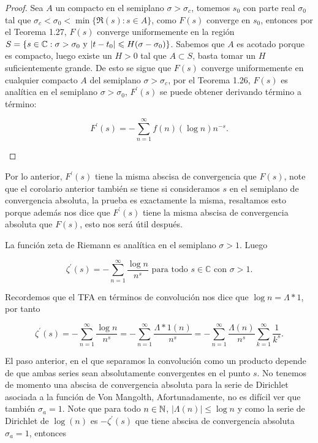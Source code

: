 \begin{proof}
Sea $A$ un compacto en el semiplano $\sigma>\sigma_c$, tomemos $s_0$ con parte real $\sigma_0$ tal que $\sigma_c<\sigma_0<\min\{\Re(s): s\in A\}$, como $F(s)$ converge en $s_0$, entonces por el Teorema 1.27, $F(s)$ converge uniformemente en la región $S=\{s\in \mathbb{C} : \sigma>\sigma_0 \text{ y } |t-t_0|\leqslant H(\sigma-\sigma_0)\}$. Sabemos que $A$ es acotado porque es compacto, luego existe un $H>0$ tal que $A\subset S$, basta tomar un $H$ suficientemente grande. De  esto se sigue que $F(s)$ converge uniformemente en cualquier compacto $A$ del semiplano $\sigma>\sigma_c$, por el Teorema 1.26, $F(s)$ es analítica en el semiplano $\sigma>\sigma_0$, $F^{\prime}(s)$ se puede obtener derivando término a término:

$$F^{\prime}(s)=-\sum_{n=1}^{\infty} f(n)(\log n) n^{-s}.$$
\begin{center}

\end{center}
\end{proof}

\begin{note}
Por lo anterior, $F^{\prime}(s)$ tiene la misma abscisa de convergencia que $F(s)$, note que el corolario anterior también se tiene si consideramos $s$ en el semiplano de convergencia absoluta, la prueba es exactamente la misma, resaltamos esto porque además nos dice que $F^{\prime}(s)$ tiene la misma abscisa de convergencia absoluta que $F(s)$, esto nos será útil después.\cite{apostol1998introduction}
\end{note}

\begin{corollary}
La función zeta de Riemann es analítica en el semiplano $\sigma>1$. Luego

$$\zeta^{\prime}(s)=-\sum_{n=1}^{\infty}\frac{\log n}{n^s} \text{ para todo } s \in \mathbb{C} \text{ con } \sigma>1.$$
\end{corollary}

Recordemos que el TFA en términos de convolución nos dice que $\log n=\Lambda*1$, por tanto

$$\zeta^{\prime}(s)=-\sum_{n=1}^{\infty}\frac{\log n}{n^s}=-\sum_{n=1}^{\infty}\frac{\Lambda *1(n)}{n^s}=-\sum_{n=1}^{\infty}\frac{\Lambda(n)}{n^s}\sum_{k=1}^{\infty} \frac{1}{k^s}.$$

El paso anterior, en el que separamos la convolución como un producto depende de que ambas series sean absolutamente convergentes en el punto $s$. No tenemos de momento una abscisa de convergencia absoluta  para la serie de Dirichlet asociada a la función de Von Mangolth, Afortunadamente, no es difícil ver que también $\sigma_a=1$. Note que para todo $n\in \mathbb{N}$, $|\Lambda(n)|\leq \log n$ y como la serie de Dirichlet de $\log(n)$ es $-\zeta^{\prime}(s)$ que tiene abscisa de convergencia absoluta $\sigma_a=1$, entonces

